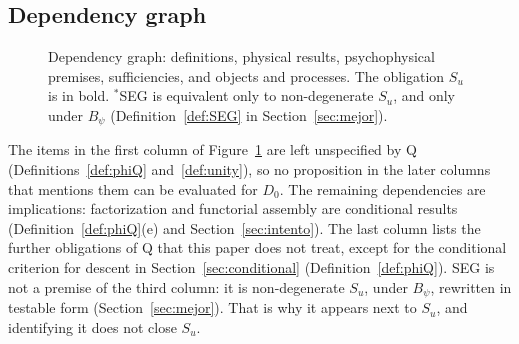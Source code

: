 \subsection{Dependency graph}\label{sec:grafo}
\begin{figure}[htbp]
\centering
{\small{}}
\caption{Dependency graph: definitions, physical results, psychophysical premises, sufficiencies, and objects and processes. The obligation $S_u$ is in bold. ${}^{\ast}$SEG is equivalent only to non-degenerate $S_u$, and only under $B_\psi$ (Definition~\ref{def:SEG} in Section~\ref{sec:mejor}).}
\label{fig:graph}
\end{figure}
The items in the first column of Figure~\ref{fig:graph} are left unspecified by Q (Definitions~\ref{def:phiQ} and~\ref{def:unity}), so no proposition in the later columns that mentions them can be evaluated for $D_0$. The remaining dependencies are implications: factorization and functorial assembly are conditional results (Definition~\ref{def:phiQ}(e) and Section~\ref{sec:intento}). The last column lists the further obligations of Q that this paper does not treat, except for the conditional criterion for descent in Section~\ref{sec:conditional} (Definition~\ref{def:phiQ}). SEG is not a premise of the third column: it is non-degenerate $S_u$, under $B_\psi$, rewritten in testable form (Section~\ref{sec:mejor}). That is why it appears next to $S_u$, and identifying it does not close $S_u$.

